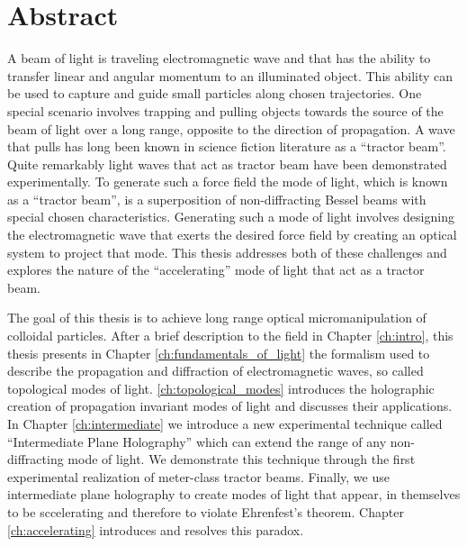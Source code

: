 \chapter*{Abstract}
\label{ch:abstract}


{
\fancyhf{}
}


A beam of light is traveling electromagnetic wave and that has the ability to transfer linear and angular momentum to an illuminated object. This ability can be used to capture and guide small particles along chosen trajectories. One special scenario involves trapping and pulling objects towards the source of the beam of light over a long range, opposite to the direction of propagation. A wave that pulls has long been known in science fiction literature as a ``tractor beam''. Quite remarkably light waves that act as tractor beam have been demonstrated experimentally. To generate such a force field the mode of light, which is known as a ``tractor beam'', is a superposition of non-diffracting Bessel beams with special chosen characteristics. Generating such a mode of light involves designing the electromagnetic wave that exerts the desired force field by creating an optical system to project that mode. This thesis addresses both of these challenges and explores the nature of the ``accelerating'' mode of light that act as a tractor beam. 

The goal of this thesis is to achieve long range optical micromanipulation of colloidal particles. After a brief description to the field in Chapter \ref{ch:intro}, this thesis presents in Chapter \ref{ch:fundamentals_of_light} the formalism used to describe the propagation and diffraction of electromagnetic waves, so called topological modes of light. \ref{ch:topological_modes} introduces the holographic creation of propagation invariant modes of light and discusses their applications. In Chapter \ref{ch:intermediate} we introduce a new experimental technique called ``Intermediate Plane Holography'' which can extend the range of any non-diffracting mode of light. We demonstrate this technique through the first experimental realization of meter-class tractor beams. Finally, we use intermediate plane holography to create modes of light that appear, in themselves to be sccelerating and therefore to violate  Ehrenfest's theorem. Chapter \ref{ch:accelerating} introduces and resolves this paradox.